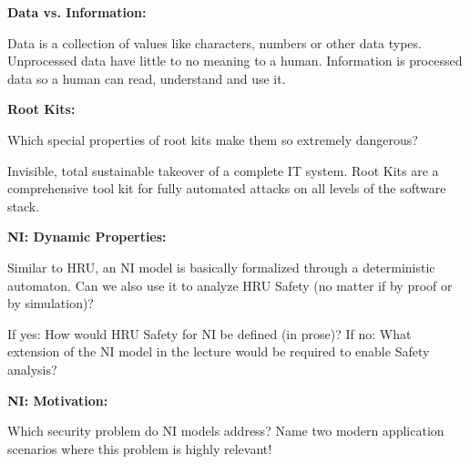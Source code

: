 \documentclass[10pt]{exam}  %
\begin{document}
\begin{questions}
\begin{solution}
    \end{solution}

    \question \textbf{Data vs. Information:}\hfill

    \begin{solution}
        Data is a collection of values like characters, numbers or other data types. Unprocessed data have little to no meaning to a human.
        Information is processed data so a human can read, understand and use it.
    \end{solution}

    \question \textbf{Root Kits:}\hfill

    Which special properties of root kits make them so extremely dangerous?
    \begin{solution}
        Invisible, total sustainable takeover of a complete IT system. 
        Root Kits are a comprehensive tool kit for fully automated attacks on all levels of the software stack.
    \end{solution}

    \question \textbf{NI: Dynamic Properties:}\hfill

    Similar to HRU, an NI model is basically formalized through a deterministic automaton. Can we also use it to analyze HRU Safety (no matter if by proof or by simulation)?

    If yes: How would HRU Safety for NI be defined (in prose)? If no: What extension of the NI model in the lecture would be required to enable Safety analysis?
    \begin{solution}
    \end{solution}

    \question \textbf{NI: Motivation:}\hfill

    Which security problem do NI models address? Name two modern application scenarios where this problem is highly relevant!
    \begin{solution}
    \end{solution}


\end{questions}
\end{document}
